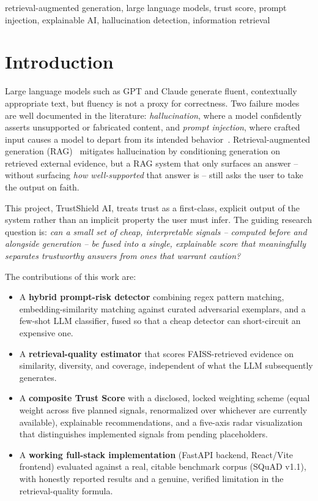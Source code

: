 \documentclass[conference]{IEEEtran}
\begin{document}
\begin{IEEEkeywords}
retrieval-augmented generation, large language models, trust score, prompt injection,
explainable AI, hallucination detection, information retrieval
\end{IEEEkeywords}

\section{Introduction}

Large language models such as GPT and Claude generate fluent, contextually appropriate
text, but fluency is not a proxy for correctness. Two failure modes are well documented
in the literature: \emph{hallucination}, where a model confidently asserts unsupported or
fabricated content, and \emph{prompt injection}, where crafted input causes a model to
depart from its intended behavior~\cite{owasp_llm}. Retrieval-augmented generation
(RAG)~\cite{lewis2020rag} mitigates hallucination by conditioning generation on retrieved
external evidence, but a RAG system that only surfaces an answer -- without surfacing
\emph{how well-supported} that answer is -- still asks the user to take the output on
faith.

This project, TrustShield AI, treats trust as a first-class, explicit output of the
system rather than an implicit property the user must infer. The guiding research
question is: \emph{can a small set of cheap, interpretable signals -- computed before and
alongside generation -- be fused into a single, explainable score that meaningfully
separates trustworthy answers from ones that warrant caution?}

The contributions of this work are:
\begin{itemize}
  \item A \textbf{hybrid prompt-risk detector} combining regex pattern matching,
  embedding-similarity matching against curated adversarial exemplars, and a few-shot
  LLM classifier, fused so that a cheap detector can short-circuit an expensive one.
  \item A \textbf{retrieval-quality estimator} that scores FAISS-retrieved evidence on
  similarity, diversity, and coverage, independent of what the LLM subsequently generates.
  \item A \textbf{composite Trust Score} with a disclosed, locked weighting scheme
  (equal weight across five planned signals, renormalized over whichever are currently
  available), explainable recommendations, and a five-axis radar visualization that
  distinguishes implemented signals from pending placeholders.
  \item A \textbf{working full-stack implementation} (FastAPI backend, React/Vite
  frontend) evaluated against a real, citable benchmark corpus (SQuAD v1.1), with
  honestly reported results and a genuine, verified limitation in the retrieval-quality
  formula.
\end{itemize}
\end{document}
